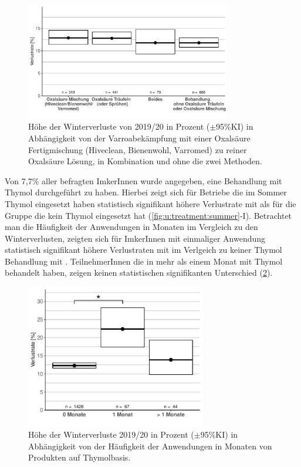 \begin{figure}[H]
  \centering
  \includegraphics[keepaspectratio,width=0.8\textwidth]{project-U-wintersterblichkeit/figures/plot_treatment_oxalmix}
  \caption{Höhe der Winterverluste von 2019/20 in Prozent ($\pm$95\%KI) in Abhängigkeit von der Varroabekämpfung mit einer Oxalsäure Fertigmischung (Hiveclean, Bienenwohl, Varromed) zu reiner Oxalsäure Lösung, in Kombination und ohne die zwei Methoden.}
  \label{fig:u:treatment:oxalmix}
\end{figure}


Von 7,7\% aller befragten ImkerInnen wurde angegeben, eine Behandlung mit Thymol durchgeführt zu haben. Hierbei zeigt sich für Betriebe die im Sommer Thymol eingesetzt haben statistisch signifikant höhere Verlustrate mit  als für die Gruppe die kein Thymol eingesetzt hat  (\cref{fig:u:treatment:summer}-I).
\newline
Betrachtet man die Häufigkeit der Anwendungen in Monaten im Vergleich zu den Winterverlusten, zeigten sich für ImkerInnen mit einmaliger Anwendung statistisch signifikant höhere Verlustraten mit  im Verlgeich zu keiner Thymol Behandlung mit . TeilnehmerInnen die in mehr als einem Monat mit Thymol behandelt haben, zeigen keinen statistischen signifikanten Unterschied  (\cref{fig:u:treatment:thymol:grouped}).

\begin{figure}[H]
  \centering
  \includegraphics[keepaspectratio,width=0.7\textwidth]{project-U-wintersterblichkeit/figures/plot_treatment_thymol_grouped}
  \caption{Höhe der Winterverluste 2019/20 in Prozent (\(\pm\)95\%KI) in Abhängigkeit von der Häufigkeit der Anwendungen in Monaten von Produkten auf Thymolbasis.}
  \label{fig:u:treatment:thymol:grouped}
\end{figure}

